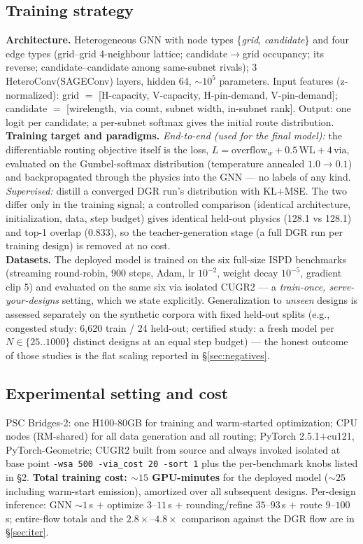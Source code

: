 \documentclass[11pt]{article}
\begin{document}
\subsection{Training strategy}\label{sec:training}
\textbf{Architecture.} Heterogeneous GNN with node types
\{\emph{grid}, \emph{candidate}\} and four edge types (grid--grid
4-neighbour lattice; candidate$\to$grid occupancy; its reverse;
candidate--candidate among same-subnet rivals); 3 HeteroConv(SAGEConv)
layers, hidden 64, ${\sim}10^5$ parameters. Input features (z-normalized):
grid $=$ [H-capacity, V-capacity, H-pin-demand, V-pin-demand]; candidate
$=$ [wirelength, via count, subnet width, in-subnet rank]. Output: one logit
per candidate; a per-subnet softmax gives the initial route distribution.\\
\textbf{Training target and paradigms.} \emph{End-to-end (used for the final
model):} the differentiable routing objective itself is the loss,
$L = \text{overflow}_w + 0.5\,\text{WL} + 4\,\text{via}$, evaluated on the
Gumbel-softmax distribution (temperature annealed $1.0\to0.1$) and
backpropagated through the physics into the GNN --- no labels of any kind.
\emph{Supervised:} distill a converged DGR run's distribution with
KL$+$MSE. The two differ only in the training signal; a controlled
comparison (identical architecture, initialization, data, step budget) gives
identical held-out physics (128.1 vs 128.1) and top-1 overlap (0.833), so
the teacher-generation stage (a full DGR run per training design) is
removed at no cost.\\
\textbf{Datasets.} The deployed model is trained on the six full-size ISPD
benchmarks (streaming round-robin, 900 steps, Adam, lr $10^{-2}$, weight
decay $10^{-5}$, gradient clip 5) and evaluated on the same six via isolated
CUGR2 --- a \emph{train-once, serve-your-designs} setting, which we state
explicitly. Generalization to \emph{unseen} designs is assessed separately
on the synthetic corpora with fixed held-out splits (e.g., congested study:
6{,}620 train / 24 held-out; certified study: a fresh model per
$N \in \{25..1000\}$ distinct designs at an equal step budget) --- the
honest outcome of those studies is the flat scaling reported in
\S\ref{sec:negatives}.

\subsection{Experimental setting and cost}
PSC Bridges-2: one H100-80GB for training and warm-started optimization;
CPU nodes (RM-shared) for all data generation and all routing; PyTorch
2.5.1$+$cu121, PyTorch-Geometric; CUGR2 built from source and always invoked
isolated at base point \texttt{-wsa 500 -via\_cost 20 -sort 1} plus the
per-benchmark knobs listed in \S2. \textbf{Total training cost:
${\sim}15$ GPU-minutes} for the deployed model (${\sim}25$ including
warm-start emission), amortized over all subsequent designs. Per-design
inference: GNN ${\sim}1$\,s $+$ optimize $3$--$11$\,s $+$ rounding/refine
$35$--$93$\,s $+$ route $9$--$100$\,s; entire-flow totals and the
$2.8\times$--$4.8\times$ comparison against the DGR flow are in
\S\ref{sec:iter}.
\end{document}
